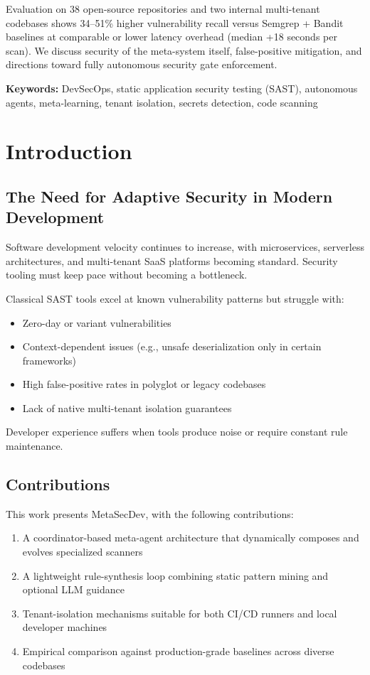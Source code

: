 \documentclass[10pt,a4paper]{article}
\begin{document}
Evaluation on 38 open-source repositories and two internal multi-tenant codebases shows 34--51\% higher vulnerability recall versus Semgrep + Bandit baselines at comparable or lower latency overhead (median +18 seconds per scan). We discuss security of the meta-system itself, false-positive mitigation, and directions toward fully autonomous security gate enforcement.

\textbf{Keywords:} DevSecOps, static application security testing (SAST), autonomous agents, meta-learning, tenant isolation, secrets detection, code scanning

\section{Introduction}

\subsection{The Need for Adaptive Security in Modern Development}

Software development velocity continues to increase, with microservices, serverless architectures, and multi-tenant SaaS platforms becoming standard. Security tooling must keep pace without becoming a bottleneck.

Classical SAST tools excel at known vulnerability patterns but struggle with:
\begin{itemize}
    \item Zero-day or variant vulnerabilities
    \item Context-dependent issues (e.g., unsafe deserialization only in certain frameworks)
    \item High false-positive rates in polyglot or legacy codebases
    \item Lack of native multi-tenant isolation guarantees
\end{itemize}

Developer experience suffers when tools produce noise or require constant rule maintenance.

\subsection{Contributions}

This work presents MetaSecDev, with the following contributions:
\begin{enumerate}
    \item A coordinator-based meta-agent architecture that dynamically composes and evolves specialized scanners
    \item A lightweight rule-synthesis loop combining static pattern mining and optional LLM guidance
    \item Tenant-isolation mechanisms suitable for both CI/CD runners and local developer machines
    \item Empirical comparison against production-grade baselines across diverse codebases
\end{enumerate}
\end{document}
